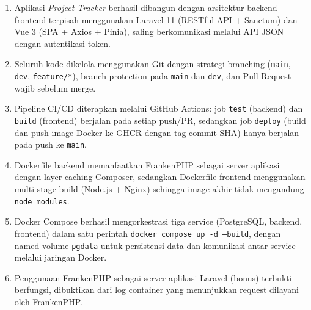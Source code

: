 \documentclass[12pt,letterpaper]{report}
\begin{document}
\begin{enumerate}[label=\arabic*.]
    \item Aplikasi \textit{Project Tracker} berhasil dibangun dengan arsitektur backend-frontend terpisah menggunakan Laravel 11 (RESTful API + Sanctum) dan Vue 3 (SPA + Axios + Pinia), saling berkomunikasi melalui API JSON dengan autentikasi token.
    \item Seluruh kode dikelola menggunakan Git dengan strategi branching (\texttt{main}, \texttt{dev}, \texttt{feature/*}), branch protection pada \texttt{main} dan \texttt{dev}, dan Pull Request wajib sebelum merge.
    \item Pipeline CI/CD diterapkan melalui GitHub Actions: job \texttt{test} (backend) dan \texttt{build} (frontend) berjalan pada setiap push/PR, sedangkan job \texttt{deploy} (build dan push image Docker ke GHCR dengan tag commit SHA) hanya berjalan pada push ke \texttt{main}.
    \item Dockerfile backend memanfaatkan FrankenPHP sebagai server aplikasi dengan layer caching Composer, sedangkan Dockerfile frontend menggunakan multi-stage build (Node.js + Nginx) sehingga image akhir tidak mengandung \texttt{node\_modules}.
    \item Docker Compose berhasil mengorkestrasi tiga service (PostgreSQL, backend, frontend) dalam satu perintah \texttt{docker compose up -d --build}, dengan named volume \texttt{pgdata} untuk persistensi data dan komunikasi antar-service melalui jaringan Docker.
    \item Penggunaan FrankenPHP sebagai server aplikasi Laravel (bonus) terbukti berfungsi, dibuktikan dari log container yang menunjukkan request dilayani oleh FrankenPHP.
\end{enumerate}
\end{document}
